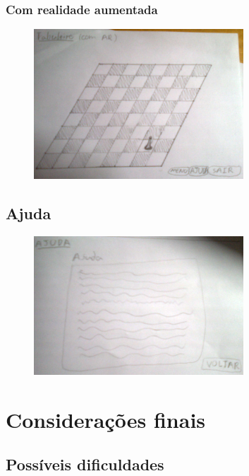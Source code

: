 \documentclass[a4paper,12pt]{book}
\begin{document}
\subsubsection{Com realidade aumentada}
\label{subsubsec: comrealidadeaumentada}

\begin{figure}[h]
\centering
\includegraphics[width=0.7\textwidth]{tabuleirocomar}
\end{figure}

\subsection{Ajuda}
\label{subsubsec: ajuda}

\begin{figure}[h]
\centering
\includegraphics[width=0.7\textwidth]{ajuda}
\end{figure}

\newpage
\section{Considera\c c\~oes finais}
\label{sec: consideracoesfinais}

\subsection{Poss\'iveis dificuldades}
\label{subsec: possiveisdificuldades}
\end{document}
